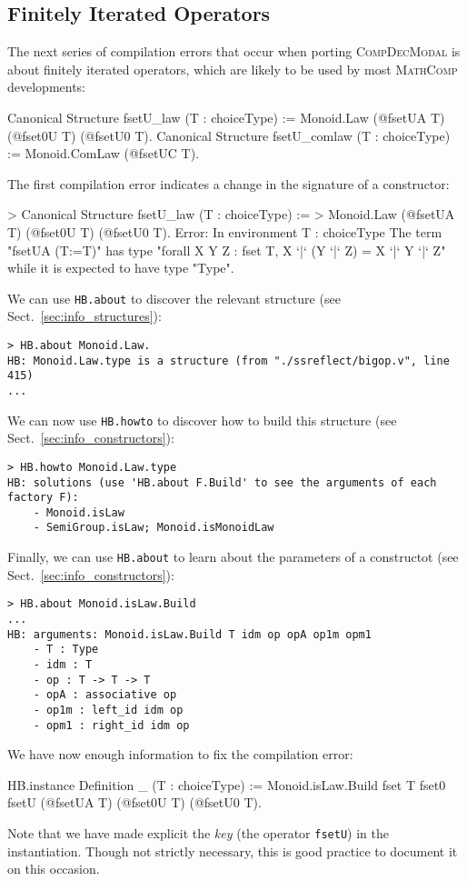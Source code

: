 \documentclass{article}
\def\mathcomp{\textsc{MathComp}}
\def\compdecmodal{\textsc{CompDecModal}}
\def\coqin#1{\texttt{#1}}
\def\newterm#1{{\sl #1}}
\begin{document}
\subsection{Finitely Iterated Operators}

The next series of compilation errors that occur when porting
\compdecmodal{} is about finitely iterated operators, which are likely
to be used by most \mathcomp{} developments:
\begin{failure}
Canonical Structure fsetU_law (T : choiceType) := 
  Monoid.Law (@fsetUA T) (@fset0U T) (@fsetU0 T).
Canonical Structure fsetU_comlaw (T : choiceType) := 
  Monoid.ComLaw (@fsetUC T).
\end{failure}

The first compilation error indicates a change in the signature of a constructor:
\begin{failure}
> Canonical Structure fsetU_law (T : choiceType) := 
>   Monoid.Law (@fsetUA T) (@fset0U T) (@fsetU0 T).
Error:
In environment
T : choiceType
The term "fsetUA (T:=T)" has type "forall X Y Z : {fset T}, X `|` (Y `|` Z) = X `|` Y `|` Z"
while it is expected to have type "Type".
\end{failure}
We can use \coqin{HB.about} to discover the relevant structure (see Sect.~\ref{sec:info_structures}):
\begin{verbatim}
> HB.about Monoid.Law.
HB: Monoid.Law.type is a structure (from "./ssreflect/bigop.v", line 415)
...
\end{verbatim}
We can now use \coqin{HB.howto} to discover how to build this structure (see Sect.~\ref{sec:info_constructors}):
\begin{verbatim}
> HB.howto Monoid.Law.type
HB: solutions (use 'HB.about F.Build' to see the arguments of each factory F):
    - Monoid.isLaw
    - SemiGroup.isLaw; Monoid.isMonoidLaw
\end{verbatim}
Finally, we can use \coqin{HB.about} to learn about the parameters of a constructot (see Sect.~\ref{sec:info_constructors}):
\begin{verbatim}
> HB.about Monoid.isLaw.Build
...
HB: arguments: Monoid.isLaw.Build T idm op opA op1m opm1
    - T : Type
    - idm : T
    - op : T -> T -> T
    - opA : associative op
    - op1m : left_id idm op
    - opm1 : right_id idm op
\end{verbatim}
We have now enough information to fix the compilation error:
\begin{success}
HB.instance Definition _ (T : choiceType) := 
  Monoid.isLaw.Build {fset T} fset0 fsetU (@fsetUA T) (@fset0U T) (@fsetU0 T).  
\end{success}
Note that we have made explicit the \newterm{key} (the operator
\coqin{fsetU}) in the instantiation. Though not strictly necessary, this is
good practice to document it on this occasion.
\end{document}
